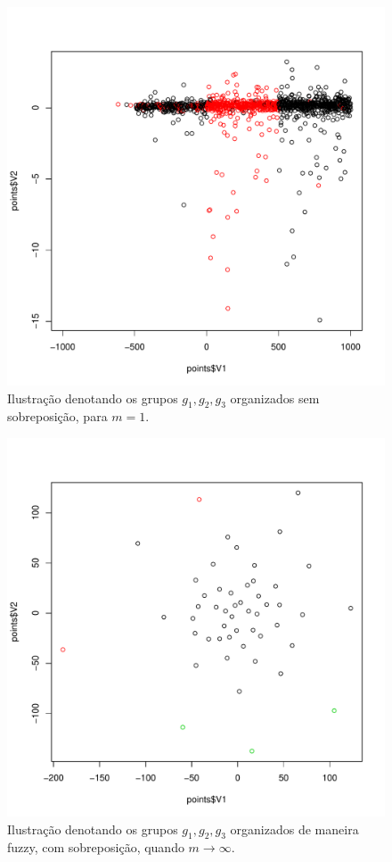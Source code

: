 \begin{figure}[!htp] \centering 
  \centering
  \includegraphics[width=0.8\columnwidth]{assets/pdcl/20newsgrou2fcmsoft-fdcleuclidian.pdf} 
  \caption{Ilustração denotando os
  grupos $g_1,g_2,g_3$ organizados sem sobreposição, para $m = 1$.} 
  \label{fig:newsgroup}
\end{figure}
\begin{figure}[!htp] \centering 
    \includegraphics[width=0.8\columnwidth]{assets/pdcl/pfcmmixed-pdcleuclidian.pdf} 
    \caption{Ilustração denotando os
     grupos $g_1,g_2,g_3$ organizados de maneira fuzzy, com sobreposição, quando 
     $m \rightarrow \infty$.}
     \label{fig:mixed_opinosis} 
\end{figure}

